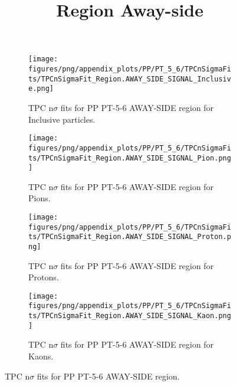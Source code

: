             \begin{figure}[H]
                \title{Region Away-side}
                \begin{subfigure}[b]{0.5\textwidth}
                    \centering
                    \texttt{[image: figures/png/appendix\_plots/PP/PT\_5\_6/TPCnSigmaFits/TPCnSigmaFit\_Region.AWAY\_SIDE\_SIGNAL\_Inclusive.png]}
                    \caption{TPC n$\sigma$ fits for PP PT-5-6 AWAY-SIDE region for Inclusive particles.}
                    \label{fig:appendix_PP_PT-5-6_AWAY_SIDE_SIGNAL_Inclusive}
                \end{subfigure}
                \begin{subfigure}[b]{0.5\textwidth}
                    \centering
                    \texttt{[image: figures/png/appendix\_plots/PP/PT\_5\_6/TPCnSigmaFits/TPCnSigmaFit\_Region.AWAY\_SIDE\_SIGNAL\_Pion.png]}
                    \caption{TPC n$\sigma$ fits for PP PT-5-6 AWAY-SIDE region for Pions.}
                    \label{fig:appendix_PP_PT-5-6_AWAY_SIDE_SIGNAL_Pion}
                \end{subfigure}
                \begin{subfigure}[b]{0.5\textwidth}
                    \centering
                    \texttt{[image: figures/png/appendix\_plots/PP/PT\_5\_6/TPCnSigmaFits/TPCnSigmaFit\_Region.AWAY\_SIDE\_SIGNAL\_Proton.png]}
                    \caption{TPC n$\sigma$ fits for PP PT-5-6 AWAY-SIDE region for Protons.}
                    \label{fig:appendix_PP_PT-5-6_AWAY_SIDE_SIGNAL_Proton}
                \end{subfigure}
                \begin{subfigure}[b]{0.5\textwidth}
                    \centering
                    \texttt{[image: figures/png/appendix\_plots/PP/PT\_5\_6/TPCnSigmaFits/TPCnSigmaFit\_Region.AWAY\_SIDE\_SIGNAL\_Kaon.png]}
                    \caption{TPC n$\sigma$ fits for PP PT-5-6 AWAY-SIDE region for Kaons.}
                    \label{fig:appendix_PP_PT-5-6_AWAY_SIDE_SIGNAL_Kaon}
                \end{subfigure}
                \caption{TPC n$\sigma$ fits for PP PT-5-6 AWAY-SIDE region.}
                \label{fig:appendix_PP_PT-5-6_AWAY_SIDE_SIGNAL}
            \end{figure}
